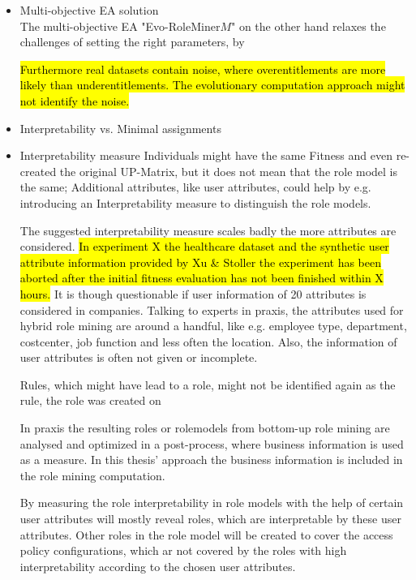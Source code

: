 \begin{itemize}
	
	\item Multi-objective EA solution\\
	The multi-objective EA "Evo-RoleMiner$M$" on the other hand relaxes the challenges of setting the right parameters, by 
	
	\hl{Furthermore real datasets contain noise, where overentitlements are more likely than underentitlements. The evolutionary computation approach might not identify the noise.}
	
	\item Interpretability vs. Minimal assignments\\
	
	\item Interpretability measure
	Individuals might have the same Fitness and even re-created the original UP-Matrix, but it does not mean that the role model is the same; Additional attributes, like user attributes, could help by e.g. introducing an Interpretability measure to distinguish the role models.
	
	The suggested interpretability measure scales badly the more attributes are considered. \hl{In experiment X the healthcare dataset and the synthetic user attribute information provided by Xu \& Stoller the experiment has been aborted after the initial fitness evaluation has not been finished within X hours.} It is though questionable if user information of 20 attributes is considered in companies. Talking to experts in praxis, the attributes used for hybrid role mining are around a handful, like e.g. employee type, department, costcenter, job function and less often the location. Also, the information of user attributes is often not given or incomplete.
	
	Rules, which might have lead to a role, might not be identified again as the rule, the role was created on
	
	In praxis the resulting roles or rolemodels from bottom-up role mining are analysed and optimized in a post-process, where business information is used as a measure. In this thesis' approach the business information is included in the role mining computation.
	
	By measuring the role interpretability in role models with the help of certain user attributes will mostly reveal roles, which are interpretable by these user attributes. Other roles in the role model will be created to cover the access policy configurations, which ar not covered by the roles with high interpretability according to the chosen user attributes.
	

\end{itemize}
